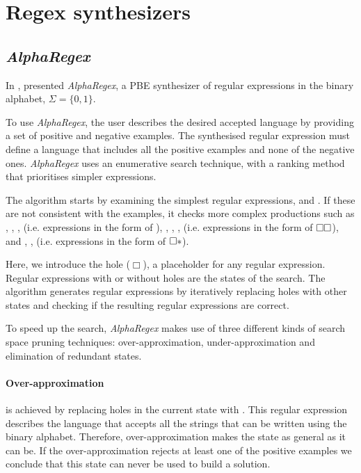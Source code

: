 \section{Regex synthesizers}\label{sec:related-work}



\subsection{\textit{AlphaRegex}}
\label{sec:synth-predicates}
In \citeyear{DBLP:conf/gpce/LeeSO16}, \citeauthor{DBLP:conf/gpce/LeeSO16} \cite{DBLP:conf/gpce/LeeSO16} presented \textit{AlphaRegex}, a \ac{PBE} synthesizer of regular expressions in the binary alphabet, \(\Sigma = \{0, 1\}\).

To use \textit{AlphaRegex}, the user describes the desired accepted language by providing a set of positive and negative examples. The synthesised regular expression must define a language that includes all the positive examples and none of the negative ones.
\textit{AlphaRegex} uses an enumerative search technique, with a ranking method that prioritises simpler expressions.

The algorithm starts by examining the simplest regular expressions,  and .
If these are not consistent with the examples, it checks more complex productions such as , , ,  (i.e. expressions in the form of \regex{\Box|\Box}), , , ,  (i.e. expressions in the form of \(\tt\Box\Box\)), and , , (i.e. expressions in the form of \(\tt\Box*\)).

Here, we introduce the hole (\(\Box\)), a placeholder for any regular expression. Regular expressions with or without holes are the states of the search.
The algorithm generates regular expressions by iteratively replacing holes with other states and checking if the resulting regular expressions are correct.

To speed up the search, \textit{AlphaRegex} makes use of three different kinds of search space pruning techniques: over-approximation, under-approximation and elimination of redundant states.

\paragraph{Over-approximation} is achieved by replacing holes in the current state with .
This regular expression describes the language that accepts all the strings that can be written using the binary alphabet.
Therefore, over-approximation makes the state as general as it can be.
If the over-approximation rejects at least one of the positive examples we conclude that this state can never be used to build a solution.

